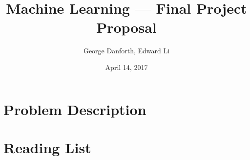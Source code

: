 \documentclass[11pt]{article}
\title{Machine Learning --- Final Project Proposal}
\author{George Danforth, Edward Li}
\date{April 14, 2017}
\begin{document}
\maketitle

\section*{Problem Description}
\section*{Reading List}
\end{document}
